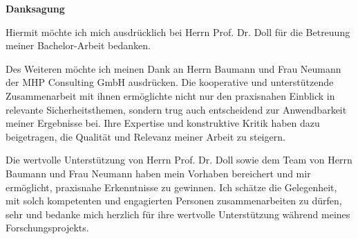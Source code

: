 \vspace*{0.5cm}
\begin{center}
   \huge{\textbf{Danksagung}}
\end{center}

\thispagestyle{empty}
\vspace{3cm}

Hiermit möchte ich mich ausdrücklich bei Herrn Prof. Dr. Doll für die Betreuung meiner Bachelor-Arbeit bedanken. 

Des Weiteren möchte ich meinen Dank an Herrn Baumann und Frau Neumann der MHP Consulting GmbH ausdrücken. Die kooperative und unterstützende Zusammenarbeit mit ihnen ermöglichte nicht nur den praxisnahen Einblick in relevante Sicherheitsthemen, sondern trug auch entscheidend zur Anwendbarkeit meiner Ergebnisse bei. Ihre Expertise und konstruktive Kritik haben dazu beigetragen, die Qualität und Relevanz meiner Arbeit zu steigern.

Die wertvolle Unterstützung von Herrn Prof. Dr. Doll sowie dem Team von Herrn Baumann und Frau Neumann haben mein Vorhaben bereichert und mir ermöglicht, praxisnahe Erkenntnisse zu gewinnen. Ich schätze die Gelegenheit, mit solch kompetenten und engagierten Personen zusammenarbeiten zu dürfen, sehr und bedanke mich herzlich für ihre wertvolle Unterstützung während meines Forschungsprojekts.